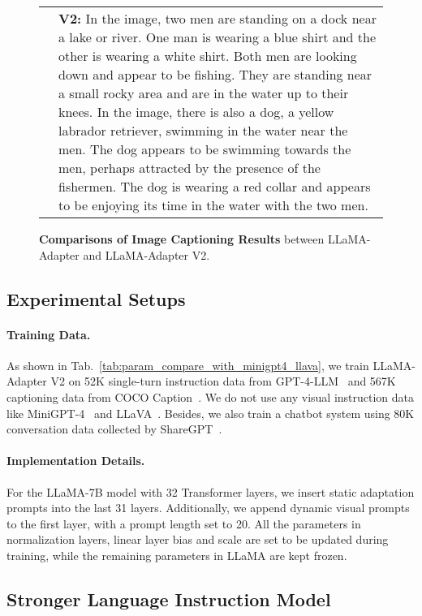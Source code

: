 \documentclass[10pt,twocolumn,letterpaper]{article}
\begin{document}
\begin{figure*}[tbhp]
{\begin{tabular}{ll}
& \begin{minipage}[t]{\columnwidth}\textbf{V2:} In the image, two men are standing on a dock near a lake or river. One man is wearing a blue shirt and the other is wearing a white shirt. Both men are looking down and appear to be fishing. They are standing near a small rocky area and are in the water up to their knees.   In the image, there is also a dog, a yellow labrador retriever, swimming in the water near the men. The dog appears to be swimming towards the men, perhaps attracted by the presence of the fishermen. The dog is wearing a red collar and appears to be enjoying its time in the water with the two men.\end{minipage} \\
\end{tabular}}
\caption{\textbf{Comparisons of Image Captioning Results} between LLaMA-Adapter and LLaMA-Adapter V2.\vspace{0.1cm}}
\label{tab:caption_demo}
\end{figure*} 

\subsection{Experimental Setups}
\paragraph{Training Data.} As shown in Tab.~\ref{tab:param_compare_with_minigpt4_llava}, we train LLaMA-Adapter V2 on 52K single-turn instruction data from GPT-4-LLM~\cite{peng2023instruction} and 567K captioning data from COCO Caption~\cite{chen2015microsoft}. We do not use any visual instruction data like MiniGPT-4~\cite{zou2022xdecoder} and LLaVA~\cite{liu2023visual}. Besides, we also train a chatbot system using 80K conversation data collected by ShareGPT~\cite{sharegpt}.


\paragraph{Implementation Details.}
For the LLaMA-7B model with 32 Transformer layers, we insert static adaptation prompts into the last 31 layers. 
Additionally, we append dynamic visual prompts to the first layer, with a prompt length set to 20. 
All the parameters in normalization layers, linear layer bias and scale are set to be updated during training, while the remaining parameters in LLaMA are kept frozen.


\subsection{Stronger Language Instruction Model}
\end{document}
